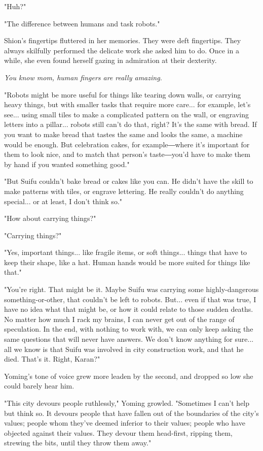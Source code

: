 "Huh?"

"The difference between humans and task robots."

Shion's fingertips fluttered in her memories. They were deft fingertips.
They always skilfully performed the delicate work she asked him to do.
Once in a while, she even found herself gazing in admiration at their
dexterity.

\emph{You know mom, human fingers are really amazing.}

"Robots might be more useful for things like tearing down walls, or
carrying heavy things, but with smaller tasks that require more care...
for example, let's see... using small tiles to make a complicated
pattern on the wall, or engraving letters into a pillar... robots still
can't do that, right? It's the same with bread. If you want to make
bread that tastes the same and looks the same, a machine would be
enough. But celebration cakes, for example―where it's important for them
to look nice, and to match that person's taste―you'd have to make them
by hand if you wanted something good."

"But Suifu couldn't bake bread or cakes like you can. He didn't have the
skill to make patterns with tiles, or engrave lettering. He really
couldn't do anything special... or at least, I don't think so."

"How about carrying things?"

"Carrying things?"

"Yes, important things... like fragile items, or soft things... things
that have to keep their shape, like a hat. Human hands would be more
suited for things like that."

"You're right. That might be it. Maybe Suifu was carrying some
highly-dangerous something-or-other, that couldn't be left to robots.
But... even if that was true, I have no idea what that might be, or how
it could relate to those sudden deaths. No matter how much I rack my
brains, I can never get out of the range of speculation. In the end,
with nothing to work with, we can only keep asking the same questions
that will never have answers. We don't know anything for sure... all we
know is that Suifu was involved in city construction work, and that he
died. That's it. Right, Karan?"

Yoming's tone of voice grew more leaden by the second, and dropped so
low she could barely hear him.

"This city devours people ruthlessly," Yoming growled. "Sometimes I
can't help but think so. It devours people that have fallen out of the
boundaries of the city's values; people whom they've deemed inferior to
their values; people who have objected against their values. They devour
them head-first, ripping them, strewing the bits, until they throw them
away."

